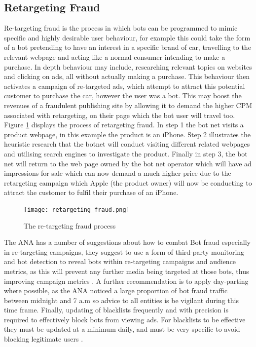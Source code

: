\documentclass[12pt]{article}
\begin{document}
\subsection{Retargeting Fraud}
Re-targeting fraud is the process in which bots can be programmed to mimic specific and highly desirable user behaviour, for example this could take the form of a bot pretending to have an interest in a specific brand of car, travelling to the relevant webpage and acting like a normal consumer intending to make a purchase. In depth behaviour may include, researching relevant topics on websites and clicking on ads, all without actually making a purchase. This behaviour then activates a campaign of re-targeted ads, which attempt to attract this potential customer to purchase the car, however the user was a bot. This may boost the revenues of a fraudulent publishing site by allowing it to demand the higher CPM associated with retargeting, on their page which the bot user will travel too. Figure \ref{fig:retargeting_fraud} displays the process of retargeting fraud. In step 1 the bot net visits a product webpage, in this example the product is an iPhone. Step 2 illustrates the heuristic research that the botnet will conduct visiting different related webpages and utilising search engines to investigate the product. Finally in step 3, the bot net will return to the web page owned by the bot net operator which will have ad impressions for sale which can now demand a much higher price due to the retargeting campaign which Apple (the product owner) will now be conducting to attract the customer to fulfil their purchase of an iPhone.  \\

\begin{figure} [H]
    \centering
    \texttt{[image: retargeting\_fraud.png]}
    \caption{The re-targeting fraud process}
    \label{fig:retargeting_fraud}
\end{figure}

The ANA has a number of suggestions about how to combat Bot fraud especially in re-targeting campaigns, they suggest to use a form of third-party monitoring and bot detection to reveal bots within re-targeting campaigns and audience metrics, as this will prevent any further media being targeted at those bots, thus improving campaign metrics \parencite{botfraud2015}. A further recommendation is to apply day-parting where possible, as the ANA noticed a large proportion of bot fraud traffic between midnight and 7 a.m so advice to all entities is be vigilant during this time frame. Finally, updating of blacklists frequently and with precision is required to effectively block bots from viewing ads. For blacklists to be effective they must be updated at a minimum daily, and must be very specific to avoid blocking legitimate users \parencite{botfraud2015}.  
\end{document}
